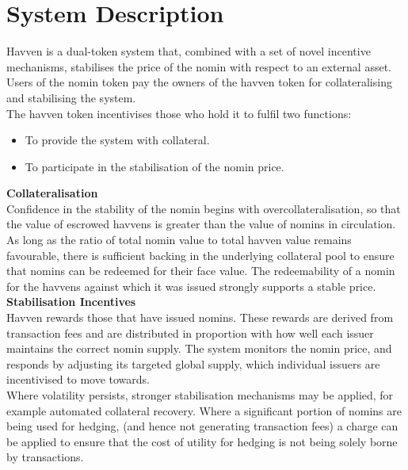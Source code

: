 \section{System Description} Havven is a dual-token system that, combined
with a set of novel incentive mechanisms, stabilises the price of the nomin
with respect to an external asset. Users of the nomin token pay the owners of
the havven token for collateralising and stabilising the system. \\

\noindent The havven token incentivises those who hold it to fulfil two functions:

\begin{itemize}
\item{To provide the system with collateral.}
\item{To participate in the stabilisation of the nomin price.} \\
\end{itemize}

\noindent \textbf{Collateralisation} \\

\noindent Confidence in the stability of the nomin begins with
overcollateralisation, so that the value of escrowed havvens is greater than
the value of nomins in circulation. As long as the ratio of total nomin value
to total havven value remains favourable, there is sufficient backing in the
underlying collateral pool to ensure that nomins can be redeemed for their
face value. The redeemability of a nomin for the havvens against which it was
issued strongly supports a stable price. \\

\noindent \textbf{Stabilisation Incentives} \\

\noindent Havven rewards those that have issued nomins. These rewards are
derived from transaction fees and are distributed in proportion with how well
each issuer maintains the correct nomin supply. The system monitors the nomin
price, and responds by adjusting its targeted global supply, which individual
issuers are incentivised to move towards. \\

\noindent Where volatility persists, stronger stabilisation mechanisms may be
applied, for example automated collateral recovery. Where a significant
portion of nomins are being used for hedging, (and hence not generating
transaction fees) a charge can be applied to ensure that the cost of utility
for hedging is not being solely borne by transactions.

\newpage









\newpage
